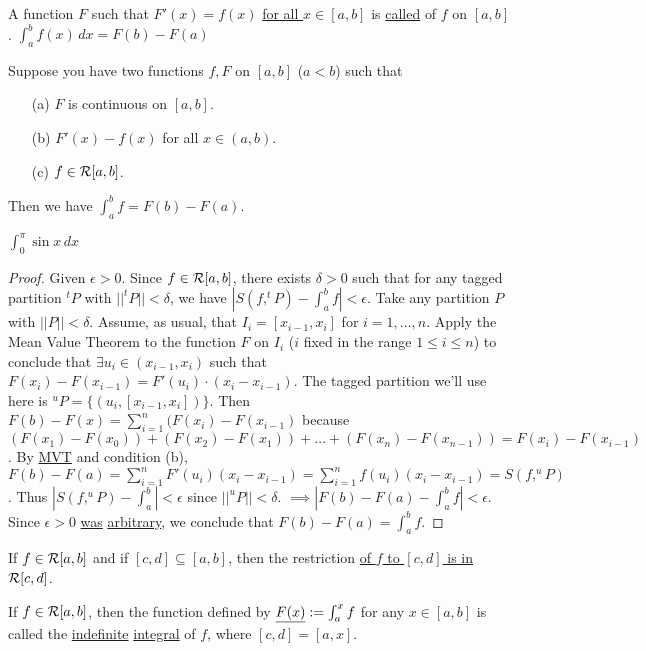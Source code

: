 \documentclass[]{article}
\begin{document}
\begin{definition}
	A function \ul{$F$} such that $F'(x) = f(x)$ \ul{for all $x\in[a,b]$} is \ul{called} \ul{} of $f$ on $[a,b]$.
	$\int_a^b f(x) \, dx = F(b) - F(a)$
\end{definition}
\begin{theorem}
	 Suppose you have two functions $f,F$ on $[a,b]$ ($a<b$) such that
	\begin{enumerate}
		\item[(a)] $F$ is continuous on $[a,b]$.
		\item[(b)] $F'(x) - f(x)$ for all $x\in(a,b)$.
		\item[(c)] \ul{$f\in\mathcal{R}[a,b]$}.
	\end{enumerate}
	Then we have \ul{$\int_a^b f = F(b) - F(a)$}.
\end{theorem}
\begin{example}
	$\int_0^\pi \sin{x} \, dx$
\end{example}
\begin{proof}
	Given $\epsilon>0$. Since $f\in\mathcal{R}[a,b]$, there exists \ul{$\delta>0$} such that for any tagged partition $^tP$ with \ul{$||^tP|| < \delta$}, we have \ul{$|S(f,^tP) - \int_a^b f | < \epsilon$}. Take any partition $P$ with $||P||<\delta$.
	Assume, as usual, that $I_i = [x_{i-1},x_i]$ for $i = 1,\dots,n$. Apply the Mean Value Theorem to the function $F$ on $I_i$ ($i$ fixed in the range $1\leq i \leq n$) to conclude that $\exists u_i \in (x_{i-1},x_i)$ such that $F(x_i) - F(x_{i-1}) = F'(u_i)\cdot (x_i-x_{i-1})$. The tagged partition we'll use here is $^uP = \{(u_i,[x_{i-1},x_i])\}$.
	Then $F(b)-F(x) = \sum_{i=1}^n (F(x_i)-F(x_{i-1})$ because $(F(x_1)-F(x_0)) + (F(x_2)-F(x_1)) + \dots + (F(x_n) - F(x_{n-1})) = F(x_i) - F(x_{i-1})$. By \ul{MVT} and condition (b), $F(b)-F(a) = \sum_{i=1}^n F'(u_i) (x_i - x_{i-1}) = \sum_{i=1}^n f(u_i) (x_i - x_{i-1}) = S(f,^uP)$. Thus $|S(f,^uP)-\int_a^b| <\epsilon$ since $||^uP||<\delta$. $\implies |F(b) - F(a) - \int_a^b f | < \epsilon$. Since $\epsilon>0$ \ul{was} \ul{arbitrary}, we conclude that $F(b)-F(a) = \int_a^b f$.
\end{proof}
\begin{theorem}
	If $f\in\mathcal{R}[a,b]$ and if $[c,d]\subseteq[a,b]$, then the restriction \ul{of $f$ to $[c,d]$ is in $\mathcal{R}[c,d]$}.
\end{theorem}
\begin{definition}
	If \ul{$f\in\mathcal{R}[a,b]$}, then the function defined by \ul{$\underline{F(x)} := \int_a^x f$} for any \ul{$x\in[a,b]$} is called the \ul{indefinite} \ul{integral} of $f$, where $[c,d] = [a,x]$.
\end{definition}
\end{document}
